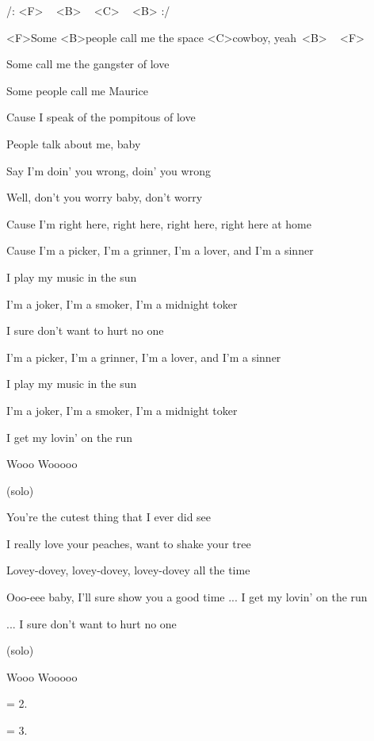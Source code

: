 
/: <F> ~ <B> ~ <C> ~ <B> :/

\zs
<F>Some <B>people call me the space <C>cowboy, yeah~<B> ~ <F>

Some call me the gangster of love

Some people call me Maurice

Cause I speak of the pompitous of love
\ks

\zs
People talk about me, baby

Say I'm doin' you wrong, doin' you wrong

Well, don't you worry baby, don't worry

Cause I'm right here, right here, right here, right here at home
\ks

\zr
Cause I'm a picker, I'm a grinner, I'm a lover, and I'm a sinner

I play my music in the sun

I'm a joker, I'm a smoker, I'm a midnight toker

I sure don't want to hurt no one

\bigskip

I'm a picker, I'm a grinner, I'm a lover, and I'm a sinner

I play my music in the sun

I'm a joker, I'm a smoker, I'm a midnight toker

I get my lovin' on the run

Wooo Wooooo
\kr

\zs
(solo)
\ks

\zs
You're the cutest thing that I ever did see

I really love your peaches, want to shake your tree

Lovey-dovey, lovey-dovey, lovey-dovey all the time

Ooo-eee baby, I'll sure show you a good time
\ks
\zr
... I get my lovin' on the run

...  I sure don't want to hurt no one

(solo)

Wooo Wooooo

\kr

\zr\kr

\zs
= 2.
\ks

\zs
= 3.
\ks
\kp
